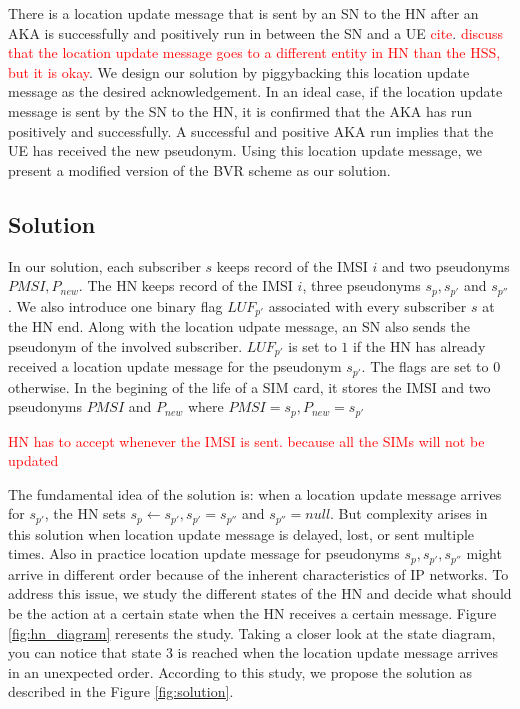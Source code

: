 \documentclass{llncs} %
\begin{document}
There is a location update message that is sent by an SN to the HN after an AKA is successfully and positively run in between the SN and a UE \textcolor{red}{cite}. \textcolor{red}{discuss that the location update message goes to a different entity in HN than the HSS, but it is okay}. We design our solution by piggybacking this location update message as the desired acknowledgement. In an ideal case, if the location update message is sent by the SN to the HN, it is confirmed that the AKA has run positively and successfully. A successful and positive AKA run implies that the  UE has received the new pseudonym. Using this location update message, we present a modified version of the BVR scheme as our solution.



\subsection{Solution}
In our solution, each subscriber $s$ keeps record of the IMSI $i$ and two pseudonyms $PMSI,P_{new}$. The HN keeps record of the IMSI $i$, three pseudonyms $s_p,s_{p'}$ and $s_{p''}$. We also introduce one binary flag $LUF_{p'}$ associated with every subscriber $s$ at the HN end. Along with the location udpate message, an SN also sends the pseudonym of the involved subscriber.  $LUF_{p'}$ is set to $1$ if the HN has already received a location update message for the pseudonym $s_{p'}$. The flags are set to $0$ otherwise. In the begining of the life of a SIM card, it stores the IMSI and two pseudonyms $PMSI$ and $P_{new}$ where $PMSI = s_p, P_{new} = s_{p'}$

\textcolor{red}{HN has to accept whenever the IMSI is sent. because all the SIMs will not be updated}

The fundamental idea of the solution is: when a location update message arrives for $s_{p'}$, the HN sets $s_p \leftarrow s_{p'}, s_{p'} = s_{p''}$ and $s_{p''} = null$. But complexity arises in this solution when location update message is delayed,  lost, or sent multiple times. Also in practice location update message for pseudonyms $s_{p},s_{p'},s_{p''}$ might arrive in different order because of the inherent characteristics of IP networks. To address this issue, we study the different states of  the HN and decide what should be the action at a certain state when the HN receives a certain message. Figure \ref{fig:hn_diagram} reresents the study. Taking a closer look at the state diagram, you can notice that state $3$ is reached when the location update message arrives in an unexpected order. According to this study, we propose the solution as described in the  Figure \ref{fig:solution}.
\end{document}
